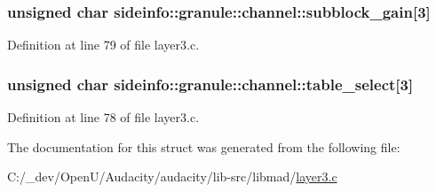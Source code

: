\subsubsection[{\texorpdfstring{subblock\+\_\+gain}{subblock_gain}}]{\setlength{\rightskip}{0pt plus 5cm}unsigned char sideinfo\+::granule\+::channel\+::subblock\+\_\+gain\mbox{[}3\mbox{]}}\hypertarget{structsideinfo_1_1granule_1_1channel_a1e49797f7a524a4b029a4c4a8c5eb80e}{}\label{structsideinfo_1_1granule_1_1channel_a1e49797f7a524a4b029a4c4a8c5eb80e}


Definition at line 79 of file layer3.\+c.

\subsubsection[{\texorpdfstring{table\+\_\+select}{table_select}}]{\setlength{\rightskip}{0pt plus 5cm}unsigned char sideinfo\+::granule\+::channel\+::table\+\_\+select\mbox{[}3\mbox{]}}\hypertarget{structsideinfo_1_1granule_1_1channel_ada65e9ee935da3f6e430851ddadec05e}{}\label{structsideinfo_1_1granule_1_1channel_ada65e9ee935da3f6e430851ddadec05e}


Definition at line 78 of file layer3.\+c.



The documentation for this struct was generated from the following file\+:\begin{DoxyCompactItemize}
\item 
C\+:/\+\_\+dev/\+Open\+U/\+Audacity/audacity/lib-\/src/libmad/\hyperlink{layer3_8c}{layer3.\+c}\end{DoxyCompactItemize}
